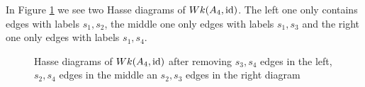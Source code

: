 \begin{exam}
	In Figure \ref{fig:a4_s1s3-and-a4_s2s4} we see two Hasse diagrams of $Wk(A_4, \operatorname{id})$. The left one only contains edges with labels $s_1,s_2$, the middle one only edges with labels $s_1,s_3$ and the right one only edges with labels $s_1,s_4$.
	\begin{figure}[ht]
		\centering
		
		\quad \quad
		
		\quad \quad
		
		\caption{Hasse diagrams of $Wk(A_4, \operatorname{id})$ after removing $s_3,s_4$ edges in the left, $s_2,s_4$ edges in the middle an $s_2,s_3$ edges in the right diagram}
		\label{fig:a4_s1s3-and-a4_s2s4}
	\end{figure}
\end{exam}